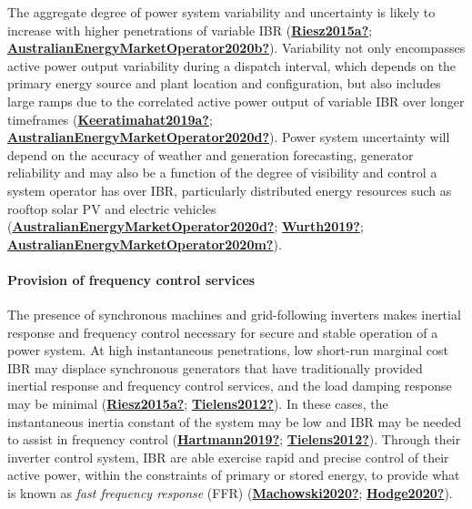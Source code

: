 \documentclass[12pt,a4paper,]{report}
\begin{document}
The aggregate degree of power system variability and uncertainty is
likely to increase with higher penetrations of variable IBR
(\protect\hyperlink{ref-Riesz2015a}{\textbf{Riesz2015a?}};
\protect\hyperlink{ref-AustralianEnergyMarketOperator2020b}{\textbf{AustralianEnergyMarketOperator2020b?}}).
Variability not only encompasses active power output variability during
a dispatch interval, which depends on the primary energy source and
plant location and configuration, but also includes large ramps due to
the correlated active power output of variable IBR over longer
timeframes
(\protect\hyperlink{ref-Keeratimahat2019a}{\textbf{Keeratimahat2019a?}};
\protect\hyperlink{ref-AustralianEnergyMarketOperator2020d}{\textbf{AustralianEnergyMarketOperator2020d?}}).
Power system uncertainty will depend on the accuracy of weather and
generation forecasting, generator reliability and may also be a function
of the degree of visibility and control a system operator has over IBR,
particularly distributed energy resources such as rooftop solar PV and
electric vehicles
(\protect\hyperlink{ref-AustralianEnergyMarketOperator2020d}{\textbf{AustralianEnergyMarketOperator2020d?}};
\protect\hyperlink{ref-Wurth2019}{\textbf{Wurth2019?}};
\protect\hyperlink{ref-AustralianEnergyMarketOperator2020m}{\textbf{AustralianEnergyMarketOperator2020m?}}).

\hypertarget{provision-of-frequency-control-services}{%
\paragraph{Provision of frequency control
services}\label{provision-of-frequency-control-services}}

The presence of synchronous machines and grid-following inverters makes
inertial response and frequency control necessary for secure and stable
operation of a power system. At high instantaneous penetrations, low
short-run marginal cost IBR may displace synchronous generators that
have traditionally provided inertial response and frequency control
services, and the load damping response may be minimal
(\protect\hyperlink{ref-Riesz2015a}{\textbf{Riesz2015a?}};
\protect\hyperlink{ref-Tielens2012}{\textbf{Tielens2012?}}). In these
cases, the instantaneous inertia constant of the system may be low and
IBR may be needed to assist in frequency control
(\protect\hyperlink{ref-Hartmann2019}{\textbf{Hartmann2019?}};
\protect\hyperlink{ref-Tielens2012}{\textbf{Tielens2012?}}). Through
their inverter control system, IBR are able exercise rapid and precise
control of their active power, within the constraints of primary or
stored energy, to provide what is known as \emph{fast frequency
response} (FFR)
(\protect\hyperlink{ref-Machowski2020}{\textbf{Machowski2020?}};
\protect\hyperlink{ref-Hodge2020}{\textbf{Hodge2020?}}).
\end{document}
